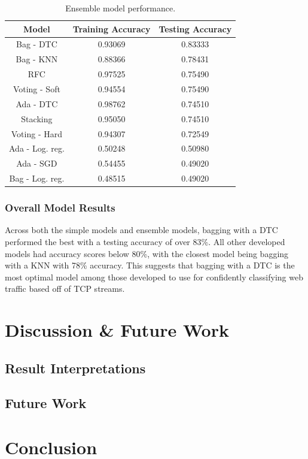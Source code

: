 \documentclass[10pt,sigconf,letterpaper,nonacm]{acmart}
\begin{document}
\begin{table}[h]
  \caption{Ensemble model performance.}
  \label{tab:ensemble}
  \begin{tabular}{ccc}
    \toprule
    Model & Training Accuracy & Testing Accuracy \\
    \midrule
    Bag - DTC & 0.93069 & 0.83333 \\
    Bag - KNN & 0.88366 & 0.78431 \\
    RFC & 0.97525 & 0.75490 \\
    Voting - Soft & 0.94554 & 0.75490 \\
    Ada - DTC & 0.98762 & 0.74510 \\
    Stacking & 0.95050 & 0.74510 \\
    Voting - Hard & 0.94307 & 0.72549 \\
    Ada - Log. reg. & 0.50248 & 0.50980 \\
    Ada - SGD & 0.54455 & 0.49020 \\
    Bag - Log. reg. & 0.48515 & 0.49020 \\
    \bottomrule
  \end{tabular}
\end{table}

\subsubsection{Overall Model Results}

Across both the simple models and ensemble models, bagging with a DTC performed the best with a testing accuracy of over 83\%.
All other developed models had accuracy scores below 80\%, with the closest model being bagging with a KNN with 78\% accuracy.
This suggests that bagging with a DTC is the most optimal model among those developed to use for confidently classifying web traffic based off of TCP streams.


\section{Discussion \& Future Work}

\subsection{Result Interpretations}



\subsection{Future Work}


\section{Conclusion}





\nocite{*}

\end{document}
